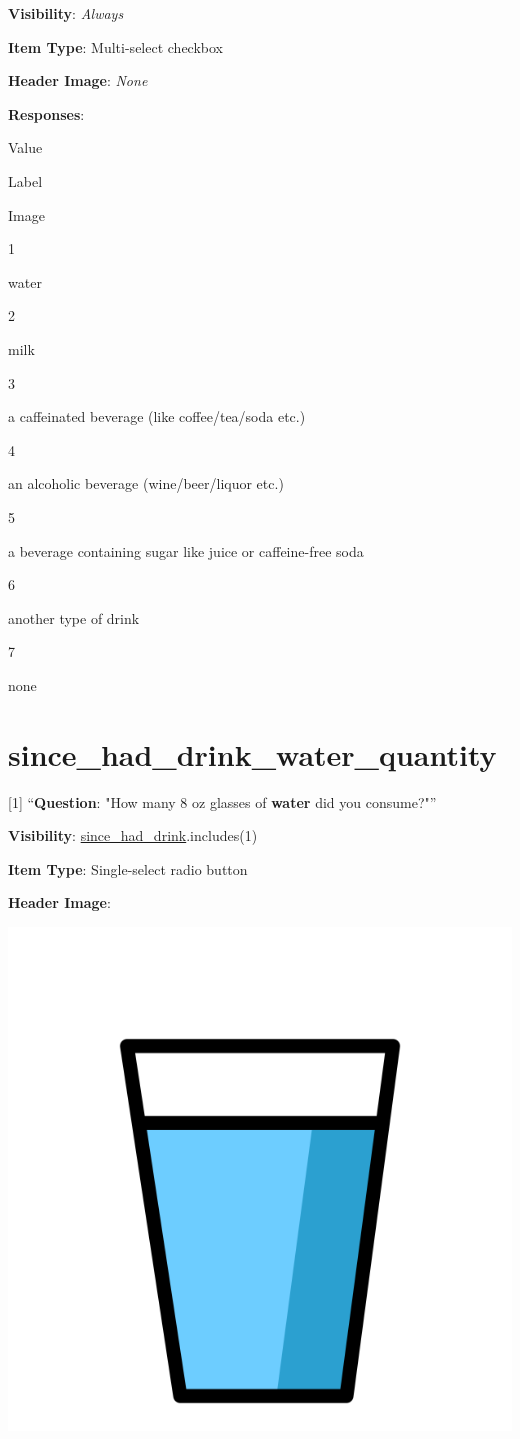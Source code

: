 \documentclass[]{book}
\begin{document}
\textbf{Visibility}: \emph{Always}

\textbf{Item Type}: Multi-select checkbox

\textbf{Header Image}: \emph{None}

\textbf{Responses}:

Value

Label

Image

1

water

2

milk

3

a caffeinated beverage (like coffee/tea/soda etc.)

4

an alcoholic beverage (wine/beer/liquor etc.)

5

a beverage containing sugar like juice or caffeine-free soda

6

another type of drink

7

none

\hypertarget{since_had_drink_water_quantity}{%
\section{since\_had\_drink\_water\_quantity}\label{since_had_drink_water_quantity}}

{[}1{]} ``\textbf{Question}: "How many 8 oz glasses of \textbf{water} did you consume?"''

\textbf{Visibility}: \protect\hyperlink{since_had_drink}{since\_had\_drink}.includes(1)

\textbf{Item Type}: Single-select radio button

\textbf{Header Image}:

\begin{flushleft}\includegraphics[width=0.33\linewidth]{downloadFigs4latex_NIMH_Applet_Codebook/since_had_drink_water_quantity_headerImg} \end{flushleft}
\end{document}
